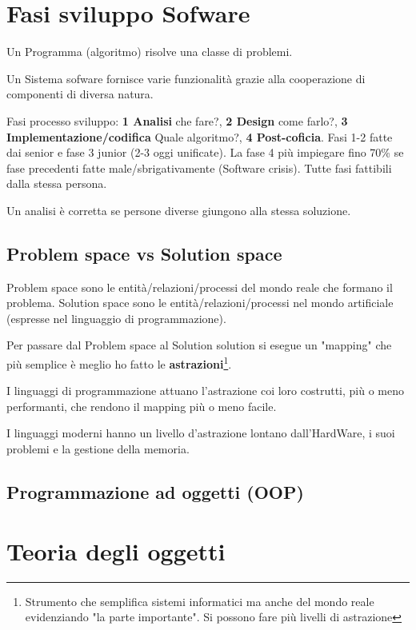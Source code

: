 \section{Fasi sviluppo Sofware}
Un Programma (algoritmo) risolve una classe di problemi.

Un Sistema sofware fornisce varie funzionalità grazie alla cooperazione di componenti di diversa natura.

Fasi processo sviluppo: \textbf{1 Analisi} che fare?, \textbf{2 Design} come farlo?, \textbf{3 Implementazione/codifica} Quale algoritmo?, \textbf{4 Post-coficia}.
Fasi 1-2 fatte dai senior e fase 3 junior (2-3 oggi unificate). La fase 4 più impiegare fino 70\% se fase precedenti fatte male/sbrigativamente (Software crisis).
Tutte fasi fattibili dalla stessa persona.

Un analisi è corretta se persone diverse giungono alla stessa soluzione.

\subsection{Problem space vs Solution space}
Problem space sono le entità/relazioni/processi del mondo reale che formano il problema. Solution space sono le entità/relazioni/processi nel mondo artificiale (espresse nel linguaggio di programmazione).

Per passare dal Problem space al Solution solution si esegue un "mapping" che più semplice è meglio ho fatto le \textbf{astrazioni}\footnote{Strumento che semplifica sistemi informatici ma anche del mondo reale evidenziando "la parte importante". Si possono fare più livelli di astrazione}.

I linguaggi di programmazione attuano l'astrazione coi loro costrutti, più o meno performanti, che rendono il mapping più o meno facile.

I linguaggi moderni hanno un livello d'astrazione lontano dall'HardWare, i suoi problemi e la gestione della memoria.

\subsection{Programmazione ad oggetti (OOP)}

\section{Teoria degli oggetti}

